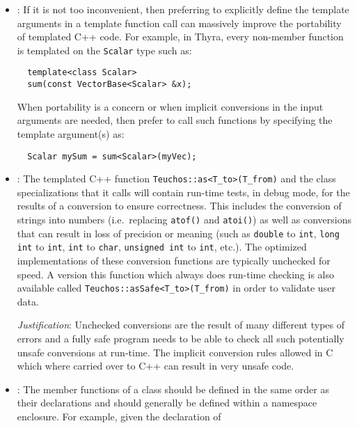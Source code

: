 \begin{itemize}


{}\item\GCGExplicitTemplateArguments: If it is not too inconvenient, then
preferring to explicitly define the template arguments in a template function
call can massively improve the portability of templated C++ code.  For
example, in Thyra, every non-member function is templated on the
{}\texttt{Scalar} type such as:

{\small\begin{verbatim}
  template<class Scalar>
  sum(const VectorBase<Scalar> &x);
\end{verbatim}}

When portability is a concern or when implicit conversions in the input
arguments are needed, then prefer to call such functions by specifying the
template argument(s) as:

{\small\begin{verbatim}
  Scalar mySum = sum<Scalar>(myVec);
\end{verbatim}}


{}\item\GCGTeuchosAs: The templated C++ function
{}\texttt{Teuchos::as<T\_to>(T\_from)} and the class specializations that it
calls will contain run-time tests, in debug mode, for the results of a
conversion to ensure correctness.  This includes the conversion of strings
into numbers (i.e.\ replacing {}\texttt{atof()} and {}\texttt{atoi()}) as well
as conversions that can result in loss of precision or meaning (such as
{}\texttt{double} to {}\texttt{int}, {}\texttt{long int} to {}\texttt{int},
{}\texttt{int} to {}\texttt{char}, {}\texttt{unsigned int} to {}\texttt{int},
etc.).  The optimized implementations of these conversion functions are
typically unchecked for speed.  A version this function which always does
run-time checking is also available called
{}\texttt{Teuchos\-::asSafe\-<\-T\_to\->\-(\-T\_from\-)} in order to validate
user data.


{}\textit{Justification}: Unchecked conversions are the result of many
different types of errors and a fully safe program needs to be able to check
all such potentially unsafe conversions at run-time.  The implicit conversion
rules allowed in C which where carried over to C++ can result in very unsafe
code.


{}\item\GCGNamespaceClassFuncDefs: The member functions of a class should be
defined in the same order as their declarations and should generally be
defined within a namespace enclosure.  For example, given the declaration of


\end{itemize}
